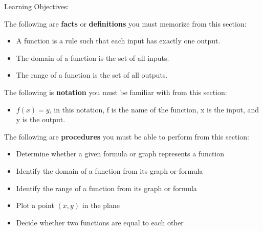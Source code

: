 \documentclass{ximera}
\begin{document}
Learning Objectives:

The following are \textbf{facts} or \textbf{definitions} you must memorize from this section:
\begin{itemize}
\item A function is a rule such that each input has exactly one output.
\item The domain of a function is the set of all inputs.
\item The range of a function is the set of all outputs.
\end{itemize}

The following is \textbf{notation} you must be familiar with from this section:
\begin{itemize}
\item $f(x)=y$, in this notation, f is the name of the function, x is the input, and y is the output.
\end{itemize}

The following are \textbf{procedures} you must be able to perform from this section:
\begin{itemize}
\item Determine whether a given formula or graph represents a function
\item Identify the domain of a function from its graph or formula
\item Identify the range of a function from its graph or formula
\item Plot a point $(x,y)$ in the plane
\item Decide whether two functions are equal to each other
\end{itemize}
\end{document}
